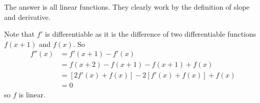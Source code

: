 The answer is all linear functions. They clearly work by the definition of slope and derivative.

Note that $f'$ is differentiable as it is the difference of two differentiable functions $f(x+1)$ and $f(x)$. So
\begin{align*}
	f''(x)&=f'(x+1)-f'(x)\\
	&=f(x+2)-f(x+1)-f(x+1)+f(x)\\
	&=[2f'(x)+f(x)]-2[f'(x)+f(x)]+f(x)\\
	&=0
\end{align*}
so $f$ is linear.